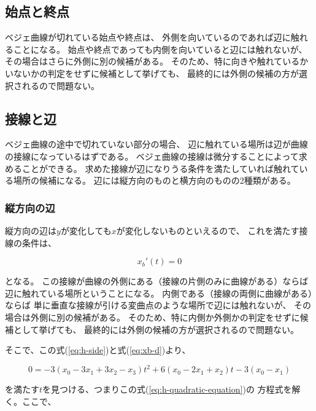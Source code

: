 \documentclass[dvipdfmx]{jsarticle}
\begin{document}
\subsection{始点と終点}

ベジェ曲線が切れている始点や終点は、
外側を向いているのであれば辺に触れることになる。
始点や終点であっても内側を向いていると辺には触れないが、
その場合はさらに外側に別の候補がある。
そのため、特に向きや触れているかいないかの判定をせずに候補として挙げても、
最終的には外側の候補の方が選択されるので問題ない。

\subsection{接線と辺}

ベジェ曲線の途中で切れていない部分の場合、
辺に触れている場所は辺が曲線の接線になっているはずである。
ベジェ曲線の接線は微分することによって求めることができる。
求めた接線が辺になりうる条件を満たしていれば触れている場所の候補になる。
辺には縦方向のものと横方向のものの2種類がある。

\subsubsection{縦方向の辺}

縦方向の辺は$y$が変化しても$x$が変化しないものといえるので、
これを満たす接線の条件は、

\begin{equation}
  x_b{}'\left(t\right) = 0
  \label{eq:h-side}
\end{equation}

となる。
この接線が曲線の外側にある（接線の片側のみに曲線がある）ならば
辺に触れている場所ということになる。
内側である（接線の両側に曲線がある）ならば
単に垂直な接線が引ける変曲点のような場所で辺には触れないが、
その場合は外側に別の候補がある。
そのため、特に内側か外側かの判定をせずに候補として挙げても、
最終的には外側の候補の方が選択されるので問題ない。

そこで、この式(\ref{eq:h-side})と式(\ref{eq:xb-d})より、

\begin{equation}
  0 =
  -3\left( x_0 -3x_1 +3x_2 -x_3 \right) t^2
  +6\left( x_0 -2x_1 + x_2 \right) t
  -3\left( x_0 - x_1 \right)
  \label{eq:h-quadratic-equation}
\end{equation}

を満たす$t$を見つける、つまりこの式(\ref{eq:h-quadratic-equation})の
方程式を解く。ここで、
\end{document}
